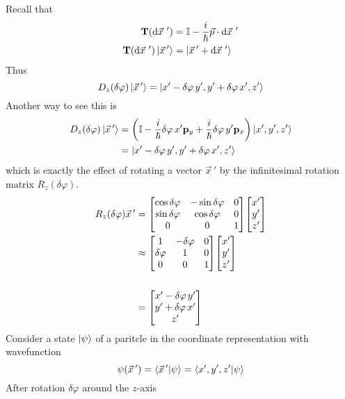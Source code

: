\documentclass[12pt,a4paper,titlepage]{article}
\begin{document}
Recall that
\begin{equation}
\begin{aligned}
\vb{T}(\dd{\vec{x}}\,')&=\mathbb{I}-\frac{i}{\hbar}\vec{p}\cdot\dd{\vec{x}}\,'\\
\vb{T}(\dd{\vec{x}}\,')\ket{\vec{x}\,'}&=\ket{\vec{x}\,'+\dd{\vec{x}}\,'}
\end{aligned}
\end{equation}
Thus
\begin{equation}
D_{z}(\delta\varphi)\ket{\vec{x}\,'}=\ket{x'-\delta\varphi\,y',y'+\delta\varphi\,x',z'}
\end{equation}
Another way to see this is
\begin{equation}
\begin{aligned}
D_{z}(\delta\varphi)\ket{\vec{x}\,'}&=\qty(\mathbb{I}-\frac{i}{\hbar}\delta\varphi\,x' \vb{p}_{y}+\frac{i}{\hbar}\delta\varphi\, y'\vb{p}_{x})\ket{x',y',z'}\\
&=\ket{x'-\delta\varphi\,y',y'+\delta\varphi\,x',z'}
\end{aligned}
\end{equation}
which is exactly the effect of rotating a vector $\vec{x}\,'$ by the infinitesimal rotation matrix $R_{z}(\delta\varphi)$.
\begin{equation}
\begin{aligned}
R_{z}(\delta\varphi)\vec{x}\,'&=\mqty[\cos\delta\varphi &-\sin\delta\varphi & 0\\ \sin\delta\varphi & \cos\delta\varphi & 0 \\ 0 & 0 & 1]\mqty[x' \\ y' \\ z']\\
&\approx \mqty[1 & -\delta\varphi & 0 \\ \delta\varphi & 1 & 0 \\ 0 & 0 & 1]\mqty[x' \\ y' \\ z']\\\\
&=\mqty[x'-\delta\varphi\,y'\\ y' + \delta\varphi\,x' \\ z']
\end{aligned}
\end{equation}
Consider a state $\ket{\psi}$ of a paritcle in the coordinate representation with wavefunction
\begin{equation}
\psi(\vec{x}\,')=\ip{\vec{x}\,'}{\psi}=\ip{x',y',z'}{\psi}
\end{equation}
After rotation $\delta\varphi$ around the $z$-axis
\end{document}
